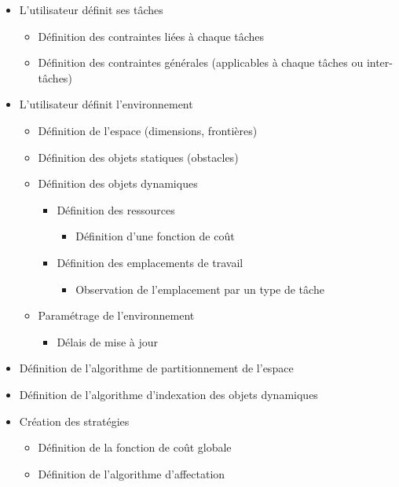 \renewcommand{\labelitemii}{$\hookrightarrow$}
\renewcommand{\labelitemiii}{$\circ$}
\begin{itemize}
\setlength{\itemsep}{5pt}
\item L'utilisateur définit ses tâches
	\begin{itemize}
	\setlength{\itemsep}{2pt}
	\item Définition des contraintes liées à chaque tâches
	\item Définition des contraintes générales (applicables à chaque tâches ou inter-tâches)
	\end{itemize}
\item L'utilisateur définit l'environnement
	\begin{itemize}
	\setlength{\itemsep}{2pt}
	\item Définition de l'espace (dimensions, frontières)
	\item Définition des objets statiques (obstacles)
	\item Définition des objets dynamiques
		\begin{itemize}
		\item Définition des ressources
			\begin{itemize}
			\item Définition d'une fonction de coût
			\end{itemize}
		\item Définition des emplacements de travail
			\begin{itemize}
			\item Observation de l'emplacement par un type de tâche
			\end{itemize}
		\end{itemize}
	\item Paramétrage de l'environnement
		\begin{itemize}
		\item Délais de mise à jour
		\end{itemize}
	\end{itemize}
\item Définition de l'algorithme de partitionnement de l'espace
\item Définition de l'algorithme d'indexation des objets dynamiques	
\item Création des stratégies
	\begin{itemize}
	\setlength{\itemsep}{2pt}
	\item Définition de la fonction de coût globale
	\item Définition de l'algorithme d'affectation
	\end{itemize}

\end{itemize}
